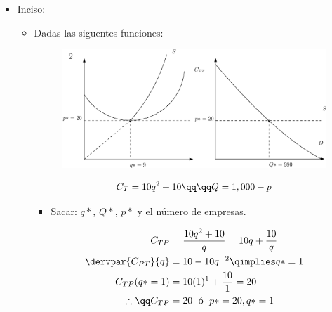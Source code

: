 \begin{itemize}
    \item Inciso: 
        \begin{itemize}
            \item Dadas las siguentes funciones: 
                \begin{center}
                    \begin{figure}[!htb]
                        \centering
                        \includegraphics[width=18cm]{./Clases/figs/02.eps}
                    \end{figure}
                \end{center}
                \begin{center}
                   \begin{align*}
                       C_{T} &= 10q^2+10 \qq \qq Q = 1,000-p \\ 
                   \end{align*}
                   \begin{itemize}
                       \item Sacar: $q*$, $Q*$, $p*$ y el número de empresas.  
                   \end{itemize}
                   \begin{align*}
                       C_{TP} &= \frac{10q^2+10}{q} = 10q +\frac{10}{q} \\
                       \dervpar{C_{PT}}{q} &= 10 - 10q^{-2} \qimplies q* = 1 \\  
                       C_{TP}(q*=1) &= 10(1)^1 + \frac{10}{1} = 20 \\ 
                       \therefore \qq C_{TP}&=20 \; \text{ ó }\; p*=20, q*=1 \\   
                   \end{align*}
                \end{center}
        \end{itemize}
\end{itemize}
